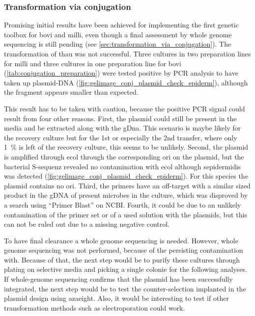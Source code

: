\subsubsection{Transformation via conjugation}
\label{sec:discuss_trafo}

Promising initial results have been achieved for implementing the first genetic toolbox for \acrshort{bovi} and \acrshort{milli}, even though a final assessment by whole genome sequencing is still pending (see \cref{sec:transformation_via_conjugation}). The transformation of \acrshort{thau} was not successful.
Three cultures in two preparation lines for \acrshort{milli} and three cultures in one preparation line for \acrshort{bovi} (\cref{tab:conjugation_preparation}) were tested positive by PCR analysis to have taken up plasmid-DNA (\cref{fig:gelimage_conj_plasmid_check_epiderm}), although the fragment appears smaller than expected. 

This result has to be taken with caution, because the positive PCR signal could result from four other reasons.
First, the plasmid could still be present in the media and be extracted along with the \acrshort{gDna}. This scenario is maybe likely for the recovery culture but for the 1st or especially the 2nd transfer, where only 1~\% is left of the recovery culture, this seems to be unlikely. Second, the plasmid is amplified through \acrshort{ecol} through the corresponding \gls{ori} on the plasmid, but the bacterial \gls{S-sequenz} revealed no contamination with \acrshort{ecol} although \acrlong{sepidermidis} was detected (\cref{fig:gelimage_conj_plasmid_check_epiderm}). For this species the plasmid contains no \gls{ori}. Third, the primers have an off-target with a similar sized product in the gDNA of present microbes in the culture, which was disproved by a search using “Primer Blast” on NCBI. Fourth, it could be due to an unlikely contamination of the primer set or of a used solution with the plasmids, but this can not be ruled out due to a missing negative control. 

To have final clearance a whole genome sequencing is needed. However, whole genome sequencing  was not performed, because of the persisting contamination with. Because of that, the next step would be to purify these cultures through plating on selective media and picking a single colonie for the following analyses.
If whole-genome sequencing confirms that the plasmid has been successfully integrated, the next step would be to test the counter-selection implanted in the plasmid design using \acrshort{azaeight}.  Also, it would be interesting to test if other transformation methods such as electroporation could work.

